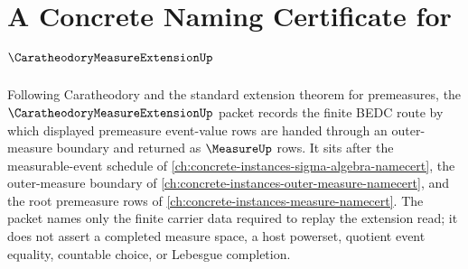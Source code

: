 \chapter{A Concrete Naming Certificate for $\CaratheodoryMeasureExtensionUp$}
\label{ch:concrete-instances-caratheodory-measure-extension-namecert}

Following Caratheodory and the standard extension theorem for premeasures, the
$\CaratheodoryMeasureExtensionUp$ packet records the finite BEDC route by
which displayed premeasure event-value rows are handed through an outer-measure
boundary and returned as $\MeasureUp$ rows. It sits after the measurable-event
schedule of \autoref{ch:concrete-instances-sigma-algebra-namecert}, the
outer-measure boundary of
\autoref{ch:concrete-instances-outer-measure-namecert}, and the root
premeasure rows of \autoref{ch:concrete-instances-measure-namecert}. The
packet names only the finite carrier data required to replay the extension
read; it does not assert a completed measure space, a host powerset, quotient
event equality, countable choice, or Lebesgue completion.

